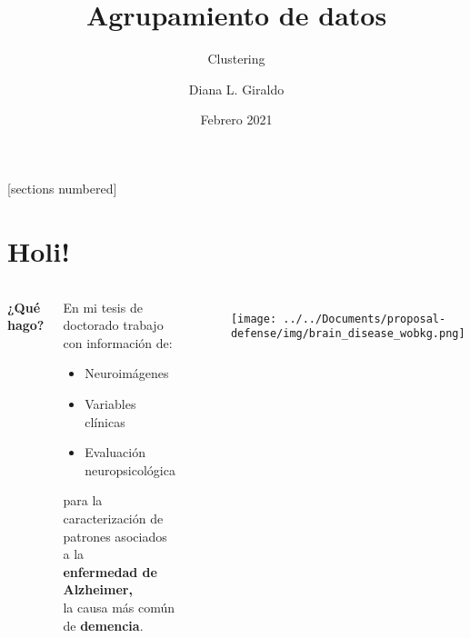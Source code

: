 \documentclass[10pt, aspectratio=169]{beamer}
\title{\textcolor{UltraViolet} {\huge Agrupamiento de datos}}
\subtitle{Clustering}
\date{Febrero 2021}
\author{Diana L. Giraldo}
\begin{document}
\maketitle

\begin{frame}{}
  [sections numbered]
  \tableofcontents[hideallsubsections]
\end{frame}


\section{Holi!}

{
\begin{frame}[fragile]{}
\vspace{0.4cm}
\begin{columns}
\alert{\textbf{\Large{¿Qué hago?}}}\\
\vspace{0.4cm}
\begin{center}
 En mi tesis de doctorado trabajo con información de:
\begin{itemize}
 \item Neuroimágenes
 \item Variables clínicas
 \item Evaluación neuropsicológica
\end{itemize}
para la caracterización de patrones asociados a la\\
\vspace{0.3cm}
\textcolor{BlueMoon}{\textbf{\Large enfermedad de Alzheimer,}}\\
\vspace{0.1cm}
la causa más común de \textbf{demencia}.
\end{center}
\begin{figure}
\texttt{[image: ../../Documents/proposal-defense/img/brain\_disease\_wobkg.png]}
\end{figure}
\end{columns} 
\end{frame}
}
\end{document}
